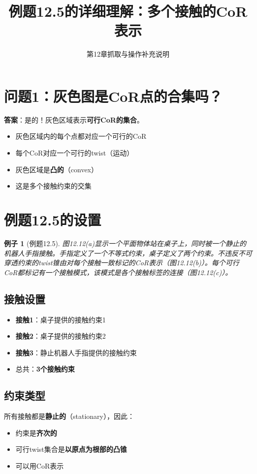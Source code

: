 \documentclass[12pt,a4paper]{article}
\title{例题12.5的详细理解：多个接触的CoR表示}
\author{第12章抓取与操作补充说明}
\date{}
\newtheorem{example}{例子}
\begin{document}
\maketitle

\section{问题1：灰色图是CoR点的合集吗？}

\textbf{答案}：是的！灰色区域表示\textbf{可行CoR的集合}。

\begin{itemize}
\item 灰色区域内的每个点都对应一个可行的CoR
\item 每个CoR对应一个可行的twist（运动）
\item 灰色区域是\textbf{凸的}（convex）
\item 这是多个接触约束的交集
\end{itemize}

\section{例题12.5的设置}

\begin{example}[例题12.5]
图12.12(a)显示一个平面物体站在桌子上，同时被一个静止的机器人手指接触。手指定义了一个不等式约束，桌子定义了两个约束。不违反不可穿透约束的twist锥由对每个接触一致标记的CoR表示（图12.12(b)）。每个可行CoR都标记有一个接触模式，该模式是各个接触标签的连接（图12.12(c)）。
\end{example}

\subsection{接触设置}

\begin{itemize}
\item \textbf{接触1}：桌子提供的接触约束1
\item \textbf{接触2}：桌子提供的接触约束2
\item \textbf{接触3}：静止机器人手指提供的接触约束
\item 总共：\textbf{3个接触约束}
\end{itemize}

\subsection{约束类型}

所有接触都是\textbf{静止的}（stationary），因此：
\begin{itemize}
\item 约束是\textbf{齐次的}
\item 可行twist集合是\textbf{以原点为根部的凸锥}
\item 可以用CoR表示
\end{itemize}
\end{document}
